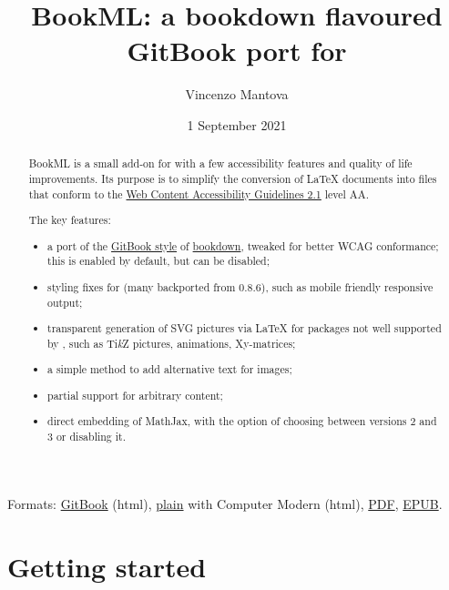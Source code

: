 \documentclass[a4paper,british]{article}
\title{BookML: a bookdown flavoured GitBook port for \texorpdfstring{\LaTeXML{}}{LaTeXML}}
\author{Vincenzo Mantova}
\date{1 September 2021}
\def\Xy{Xy}
\def\tikzname{Ti\emph{k}Z}
\begin{document}
\maketitle

\begin{abstract}
  BookML is a small add-on for \LaTeXML{} with a few accessibility features and quality of life improvements. Its purpose is to simplify the conversion of \LaTeX{} documents into \HTML{} files that conform to the \href{https://www.w3.org/TR/WCAG21/}{Web Content Accessibility Guidelines 2.1} level AA.

  The key features:
  \begin{itemize}
    \item a port of the \href{https://bookdown.org/yihui/bookdown/html.html#gitbook-style}{GitBook style} of \href{https://bookdown.org}{bookdown}, tweaked for better WCAG conformance; this is enabled by default, but can be disabled;
    \item styling fixes for \LaTeXML{} (many backported from 0.8.6), such as mobile friendly responsive output;
    \item transparent generation of SVG pictures via \LaTeX{} for packages not well supported by \LaTeXML{}, such as \tikzname{} pictures, animations, \Xy-matrices;
    \item a simple method to add alternative text for images;
    \item partial support for arbitrary \HTML{} content;
    \item direct embedding of MathJax, with the option of choosing between versions 2 and 3 or disabling it.
  \end{itemize}
\end{abstract}

\begin{center}
  Formats: \href{https://vlmantova.github.io/bookml/}{GitBook} (html), \href{https://vlmantova.github.io/bookml/index.plain.html}{plain} with Computer Modern (html), \href{https://vlmantova.github.io/bookml/docs.pdf}{PDF}, \href{https://vlmantova.github.io/bookml/docs.epub}{EPUB}.
\end{center}

\tableofcontents

\section{Getting started}
\end{document}
